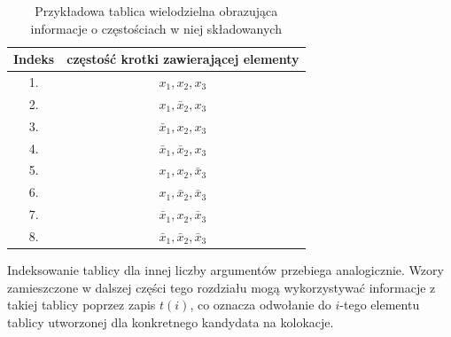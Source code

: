 \documentclass[11pt,a4paper]{llncs}
\begin{document}
\begin{table}[h!]
\centering
\begin{tabular}{c | c}
	\toprule
	Indeks	& częstość krotki zawierającej elementy									\\
	\midrule
	1. 		& \( x_{1}, 		x_{2}, 			x_{3} \)		\\
	2. 		& \( x_{1}, 		\bar{x}_{2}, 	x_{3} \)		\\
	3. 		& \( \bar{x}_{1}, 	x_{2}, 			x_{3} \)		\\
	4. 		& \( \bar{x}_{1}, 	\bar{x}_{2}, 	x_{3} \)		\\
	5. 		& \( x_{1}, 		x_{2}, 			\bar{x}_{3} \)	\\
	6. 		& \( x_{1}, 		\bar{x}_{2}, 	\bar{x}_{3} \)	\\
	7. 		& \( \bar{x}_{1}, 	x_{2}, 			\bar{x}_{3} \)	\\
	8. 		& \( \bar{x}_{1}, 	\bar{x}_{2}, 	\bar{x}_{3} \)	\\
	\bottomrule
\end{tabular}
\caption[Tablica wielodzielna dla krotki 3-elementowej]{Przykładowa tablica wielodzielna obrazująca informacje o częstościach w niej składowanych}
\label{observed_contingency_table}
\end{table}

Indeksowanie tablicy dla innej liczby argumentów przebiega analogicznie.
Wzory zamieszczone w dalszej części tego rozdziału mogą wykorzystywać informacje z takiej tablicy poprzez zapis $ t(i) $, co oznacza odwołanie do $i$-tego elementu tablicy utworzonej dla konkretnego kandydata na kolokacje.
\end{document}
